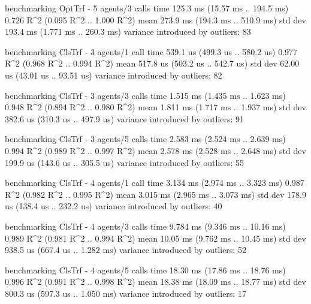 \begin{showCode}
    benchmarking OptTrf - 5 agents/3 calls
    time                 125.3 ms   (15.57 ms .. 194.5 ms)
                         0.726 R^2   (0.095 R^2 .. 1.000 R^2)
    mean                 273.9 ms   (194.3 ms .. 510.9 ms)
    std dev              193.4 ms   (1.771 ms .. 260.3 ms)
    variance introduced by outliers: 83%

    benchmarking ClsTrf - 3 agents/1 call
    time                 539.1 us   (499.3 us .. 580.2 us)
                         0.977 R^2   (0.968 R^2 .. 0.994 R^2)
    mean                 517.8 us   (503.2 us .. 542.7 us)
    std dev              62.00 us   (43.01 us .. 93.51 us)
    variance introduced by outliers: 82%

    benchmarking ClsTrf - 3 agents/3 calls
    time                 1.515 ms   (1.435 ms .. 1.623 ms)
                         0.948 R^2   (0.894 R^2 .. 0.980 R^2)
    mean                 1.811 ms   (1.717 ms .. 1.937 ms)
    std dev              382.6 us   (310.3 us .. 497.9 us)
    variance introduced by outliers: 91%

    benchmarking ClsTrf - 3 agents/5 calls
    time                 2.583 ms   (2.524 ms .. 2.639 ms)
                         0.994 R^2   (0.989 R^2 .. 0.997 R^2)
    mean                 2.578 ms   (2.528 ms .. 2.648 ms)
    std dev              199.9 us   (143.6 us .. 305.5 us)
    variance introduced by outliers: 55%

    benchmarking ClsTrf - 4 agents/1 call
    time                 3.134 ms   (2.974 ms .. 3.323 ms)
                         0.987 R^2   (0.982 R^2 .. 0.995 R^2)
    mean                 3.015 ms   (2.965 ms .. 3.073 ms)
    std dev              178.9 us   (138.4 us .. 232.2 us)
    variance introduced by outliers: 40%

    benchmarking ClsTrf - 4 agents/3 calls
    time                 9.784 ms   (9.346 ms .. 10.16 ms)
                         0.989 R^2   (0.981 R^2 .. 0.994 R^2)
    mean                 10.05 ms   (9.762 ms .. 10.45 ms)
    std dev              938.5 us   (667.4 us .. 1.282 ms)
    variance introduced by outliers: 52%

    benchmarking ClsTrf - 4 agents/5 calls
    time                 18.30 ms   (17.86 ms .. 18.76 ms)
                         0.996 R^2   (0.991 R^2 .. 0.998 R^2)
    mean                 18.38 ms   (18.09 ms .. 18.77 ms)
    std dev              800.3 us   (597.3 us .. 1.050 ms)
    variance introduced by outliers: 17%


\end{showCode}
